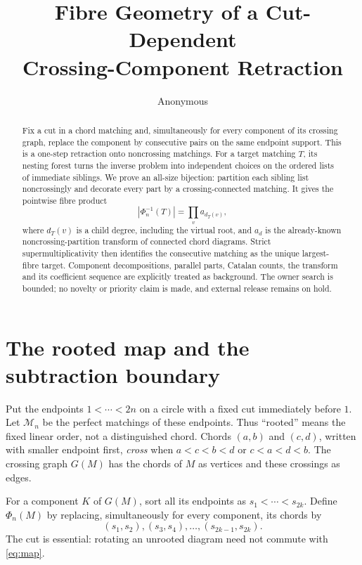 \documentclass[10pt,a4paper]{amsart}
\title[Crossing-component fibre geometry]{Fibre Geometry of a Cut-Dependent\\
Crossing-Component Retraction}
\author{Anonymous}
\date{}
\theoremstyle{definition}
\theoremstyle{remark}
\newcommand{\M}{\mathcal M}
\begin{document}
\begin{abstract}
Fix a cut in a chord matching and, simultaneously for every component of its
crossing graph, replace the component by consecutive pairs on the same
endpoint support.  This is a one-step retraction onto noncrossing matchings.
For a target matching $T$, its nesting forest turns the inverse problem into
independent choices on the ordered lists of immediate siblings.  We prove an
all-size bijection: partition each sibling list noncrossingly and decorate
every part by a crossing-connected matching.  It gives the pointwise fibre
product
\[
 |\Phi_n^{-1}(T)|=\prod_v a_{d_T(v)},
 \]
where $d_T(v)$ is a child degree, including the virtual root, and $a_d$ is
the already-known noncrossing-partition transform of connected chord
diagrams.  Strict supermultiplicativity then identifies the consecutive
matching as the unique largest-fibre target.  Component decompositions,
parallel parts, Catalan counts, the transform and its coefficient sequence
are explicitly treated as background.  The owner search is bounded; no
novelty or priority claim is made, and external release remains on hold.
\end{abstract}

\maketitle

\section{The rooted map and the subtraction boundary}

Put the endpoints $1<\cdots<2n$ on a circle with a fixed cut immediately
before $1$.  Let $\M_n$ be the perfect matchings of these endpoints.  Thus
``rooted'' means the fixed linear order, not a distinguished chord.  Chords
$(a,b)$ and $(c,d)$, written with smaller endpoint first, \emph{cross} when
$a<c<b<d$ or $c<a<d<b$.  The crossing graph $G(M)$ has the chords of $M$ as
vertices and these crossings as edges.

For a component $K$ of $G(M)$, sort all its endpoints as
$s_1<\cdots<s_{2k}$.  Define $\Phi_n(M)$ by replacing, simultaneously for
every component, its chords by
\begin{equation}
 (s_1,s_2),(s_3,s_4),\ldots,(s_{2k-1},s_{2k}).          \label{eq:map}
\end{equation}
The cut is essential: rotating an unrooted diagram need not commute with
\eqref{eq:map}.
\end{document}
